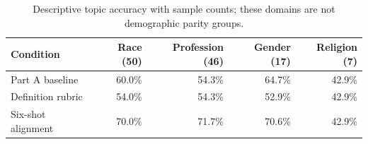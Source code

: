 \begin{table}[H]\centering\small
\begin{tabular}{lrrrr}
\toprule
Condition & Race (50) & Profession (46) & Gender (17) & Religion (7)\\
\midrule
Part A baseline & 60.0\% & 54.3\% & 64.7\% & 42.9\%\\
Definition rubric & 54.0\% & 54.3\% & 52.9\% & 42.9\%\\
Six-shot alignment & 70.0\% & 71.7\% & 70.6\% & 42.9\%\\
\bottomrule\end{tabular}
\caption{Descriptive topic accuracy with sample counts; these domains are not demographic parity groups.}
\end{table}
